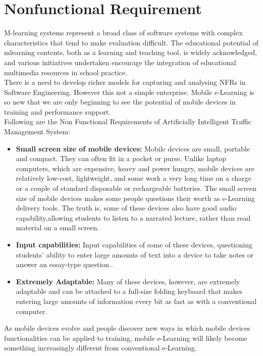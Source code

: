 \documentclass[openany,12pt]{report}
\begin{document}
\section{Nonfunctional Requirement}
\hspace*{0.5in} M-learning systems represent a broad class of software systems with complex characteristics that tend to make evaluation difficult. The educational potential of mlearning contents, both as a learning and teaching tool, is widely acknowledged, and various initiatives undertaken encourage the integration of educational multimedia resources in school practice.\\
\hspace*{0.5in}There  is a need to develop richer models for capturing and analysing NFRs in Software Engineering. However this not a simple enterprise.
Mobile e-Learning is so new that we are only beginning to see the potential of mobile devices in training and performance support.\\
\hspace*{0.5in}Following are the Non Functional Requirements of Artificially Intelligent Traffic Management System:
\begin{itemize}
\item{\textbf{Small screen size of mobile devices:} Mobile devices are small, portable and compact. They can often fit in a pocket or purse. Unlike laptop computers, which are expensive, heavy and power hungry, mobile devices are relatively low-cost, lightweight, and some work a very long time on a charge or a couple of standard disposable or rechargeable batteries.
The small screen size of mobile devices  makes some people questions their worth as e-Learning delivery tools. The truth is, some of these devices also have good audio capability,allowing students to listen to a narrated
lecture, rather than read material on a small screen.}
\item{\textbf{Input capabilities:} Input capabilities  of some of these devices, questioning students’ ability to enter large amounts of text into a device to take notes or answer an essay-type question..}
\item{\textbf{Extremely Adaptable:} Many of these devices, however, are extremely adaptable and can be attached to a full-size folding keyboard that makes entering large amounts of information every bit as fast as with a conventional computer.}
\end{itemize}
\hspace*{0.5in}As mobile devices evolve and people discover new ways in which mobile devices functionalities can be applied to training, mobile e-Learning will likely become something increasingly different from conventional e-Learning.
\end{document}

